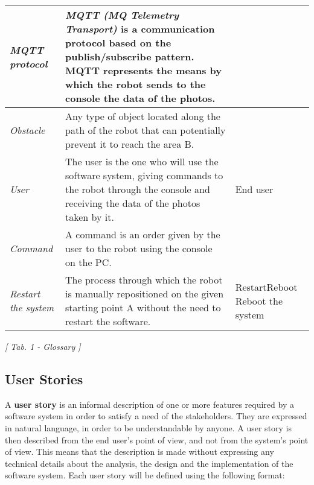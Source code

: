 \documentclass[a4paper]{article}
\begin{document}
\begin{tabular}{ | m{3cm} | m{9cm} | m{3cm} | }
	\textit{MQTT protocol} & \textit{MQTT (MQ Telemetry Transport)} is a communication protocol based on the publish/subscribe pattern. MQTT represents the means by which the robot sends to the console the data of the photos. &\\
	
	\hline
	
	\textit{Obstacle} & Any type of object located along the path of the robot that can potentially prevent it to reach the area B. & \\
	
	\hline
	
	\textit{User} & The user is the one who will use the software system, giving commands to the robot through the console and receiving the data of the photos taken by it. & End user\\
	
	\hline
	
	\textit{Command} & A command is an order given by the user to the robot using the console on the PC. &\\
	
	\hline
	
	\textit{Restart the system} & The process through which the robot is manually repositioned on the given starting point A without the need to restart the software. & Restart\newline Reboot \newline Reboot the system\\
	
	\hline 

\end{tabular}

\begin{center}
\textit{[ Tab. 1 - Glossary ]}
\end{center}


\subsection {User Stories}

A \textbf{user story} is an informal description of one or more features required by a software system in order to satisfy a need of the stakeholders. They are expressed in natural language, in order to be understandable by anyone.\newline\newline
A user story is then described from the end user's point of view, and not from the system's point of view. This means that the description is made without expressing any technical details about the analysis, the design and the implementation of the software system.\newline\newline
Each user story will be defined using the following format:
 \hfill \break
\end{document}
